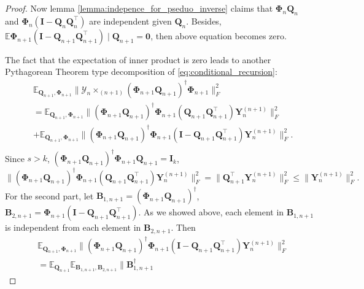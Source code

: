 \begin{lem}
\begin{proof}
Now lemma \ref{lemma:indepence_for_pseduo_inverse} claims that $\mathbf{\Phi}_n\mathbf{Q}_n$ and $\mathbf{\Phi}_n(\mathbf{I} - \mathbf{Q}_n\mathbf{Q}_n^\top)$ are independent given $\mathbf{Q}_n$. Besides, 
$\mathbb{E} \mathbf{\Phi}_{n+1}(\mathbf{I}-\mathbf{Q}_{n+1}\mathbf{Q}_{n+1}^\top )\mid \mathbf{Q}_{n+1} = \mathbf{0}$, then above equation becomes zero. \par 
The fact that the expectation of inner product is zero leads to another Pythagorean Theorem type decomposition of \eqref{eq:conditional_recursion}:
\begin{equation}
\begin{aligned}
&\mathbb{E}_{\mathbf{Q}_{n+1}, \mathbf{\Phi}_{n+1}}  \|\mathscr{Y}_n\times_{(n+1)} (\mathbf{\Phi}_{n+1}\mathbf{Q}_{n+1})^\dag \mathbf{\Phi}_{n+1}\|_F^2\\
& = \mathbb{E}_{\mathbf{Q}_{n+1}, \mathbf{\Phi}_{n+1}} \|(\mathbf{\Phi}_{n+1}\mathbf{Q}_{n+1})^\dag \mathbf{\Phi}_{n+1}(\mathbf{Q}_{n+1}\mathbf{Q}_{n+1}^\top)\mathbf{Y}_n^{(n+1)}\|_F^2\\
&+\mathbb{E}_{\mathbf{Q}_{n+1}, \mathbf{\Phi}_{n+1}} \|(\mathbf{\Phi}_{n+1}\mathbf{Q}_{n+1})^\dag \mathbf{\Phi}_{n+1}(\mathbf{I}-\mathbf{Q}_{n+1}\mathbf{Q}_{n+1}^\top)\mathbf{Y}_n^{(n+1)}\|_F^2.\\
\end{aligned}
\end{equation}
Since $s>k$, $(\mathbf{\Phi}_{n+1}\mathbf{Q}_{n+1})^\dag \mathbf{\Phi}_{n+1}\mathbf{Q}_{n+1} = \mathbf{I}_k$, 
\begin{equation}
\|(\mathbf{\Phi}_{n+1}\mathbf{Q}_{n+1})^\dag \mathbf{\Phi}_{n+1}(\mathbf{Q}_{n+1}\mathbf{Q}_{n+1}^\top)\mathbf{Y}_n^{(n+1)}\|_F^2 = \|\mathbf{Q}_{n+1}^\top\mathbf{Y}_n^{(n+1)}\|_F^2 \le \|\mathbf{Y}_n^{(n+1)}\|_F^2.
\end{equation}
 For the second part, let $\mathbf{B}_{1,n+1} = (\mathbf{\Phi}_{n+1}\mathbf{Q}_{n+1})^\dag$, $\mathbf{B}_{2,n+1} = \mathbf{\Phi}_{n+1}(\mathbf{I}-\mathbf{Q}_{n+1}\mathbf{Q}_{n+1}^\top)$. As we showed above, each element in $\mathbf{B}_{1,n+1}$ is independent from each element in $\mathbf{B}_{2,n+1}$. Then 
\begin{equation}
\begin{aligned}
&\mathbb{E}_{\mathbf{Q}_{n+1}, \mathbf{\Phi}_{n+1}} \|(\mathbf{\Phi}_{n+1}\mathbf{Q}_{n+1})^\dag \mathbf{\Phi}_{n+1}(\mathbf{I}-\mathbf{Q}_{n+1}\mathbf{Q}_{n+1}^\top)\mathbf{Y}_n^{(n+1)}\|_F^2\\
& =\mathbb{E}_{\mathbf{Q}_{n+1}} \mathbb{E}_{\mathbf{B}_{1,n+1}, \mathbf{B}_{2, n+1}} \|\mathbf{B}_{1,n+1}^\dag

\end{aligned}
\end{equation}
\end{proof}
\end{lem}

